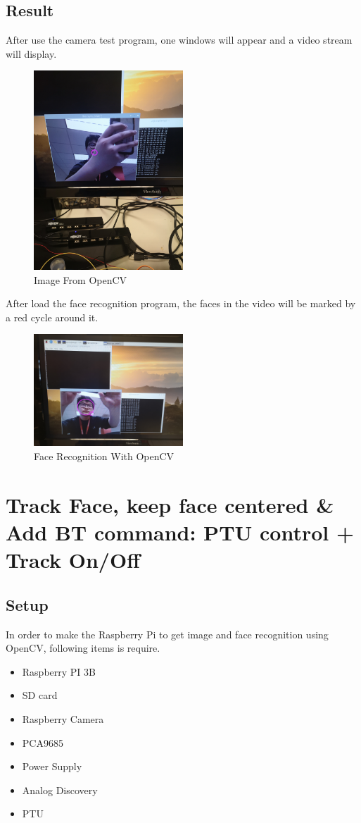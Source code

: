 \documentclass{article}
\begin{document}
\subsection{Result}
After use the camera test program, one windows will appear and a video stream will display.
\begin{figure}[hb]
	\centering
	\includegraphics[width=0.5\textwidth]{img/Lab03_11.jpg}
	\caption{Image From OpenCV} 
	\label{BBD}
\end{figure}
After load the face recognition program, the faces in the video will be marked by a red cycle around it.
\begin{figure}[hb]
	\centering
	\includegraphics[width=0.5\textwidth]{img/Lab03_09.jpg}
	\caption{Face Recognition With OpenCV} 
	\label{BBD}
\end{figure}
\clearpage
\section{Track Face, keep face centered \& Add BT command: PTU control + Track On/Off}
\subsection{Setup}
In order to make the Raspberry Pi to get image and face recognition using OpenCV, following items is require.
\begin{itemize}
	\item Raspberry PI 3B
	\item SD card
	\item Raspberry Camera
	\item PCA9685
	\item Power Supply
	\item Analog Discovery
	\item PTU
\end{itemize}
\end{document}
